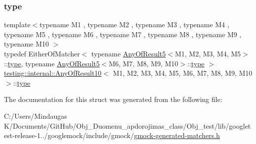 \subsubsection{\texorpdfstring{type}{type}}
{\footnotesize\ttfamily template$<$typename M1 , typename M2 , typename M3 , typename M4 , typename M5 , typename M6 , typename M7 , typename M8 , typename M9 , typename M10 $>$ \\
typedef Either\+Of\+Matcher$<$ typename \mbox{\hyperlink{structtesting_1_1internal_1_1_any_of_result5}{Any\+Of\+Result5}}$<$M1, M2, M3, M4, M5$>$\+::\mbox{\hyperlink{structtesting_1_1internal_1_1_any_of_result10_aa1cb3d733f29716f2015db8a2b6c1c94}{type}}, typename \mbox{\hyperlink{structtesting_1_1internal_1_1_any_of_result5}{Any\+Of\+Result5}}$<$M6, M7, M8, M9, M10$>$\+::\mbox{\hyperlink{structtesting_1_1internal_1_1_any_of_result10_aa1cb3d733f29716f2015db8a2b6c1c94}{type}} $>$ \mbox{\hyperlink{structtesting_1_1internal_1_1_any_of_result10}{testing\+::internal\+::\+Any\+Of\+Result10}}$<$ M1, M2, M3, M4, M5, M6, M7, M8, M9, M10 $>$\+::\mbox{\hyperlink{structtesting_1_1internal_1_1_any_of_result10_aa1cb3d733f29716f2015db8a2b6c1c94}{type}}}



The documentation for this struct was generated from the following file\+:\begin{DoxyCompactItemize}
\item 
C\+:/\+Users/\+Mindaugas K/\+Documents/\+Git\+Hub/\+Obj\+\_\+\+Duomenu\+\_\+apdorojimas\+\_\+class/\+Obj\+\_\+test/lib/googletest-\/release-\/1../googlemock/include/gmock/\mbox{\hyperlink{_obj__test_2lib_2googletest-release-1_88_81_2googlemock_2include_2gmock_2gmock-generated-matchers_8h}{gmock-\/generated-\/matchers.\+h}}\end{DoxyCompactItemize}

